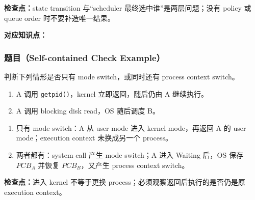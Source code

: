\textbf{检查点：}state transition 与“scheduler 最终选中谁”是两层问题；没有 policy 或 queue order 时不要补造唯一结果。


\textbf{对应知识点：}

\subsubsection*{题目（Self-contained Check Example）}

判断下列情形是否只有 mode switch，或同时还有 process context switch。

\begin{enumerate}[label=(\alph*)]
  \item A 调用 \texttt{getpid()}，kernel 立即返回，随后仍由 A 继续执行。
  \item A 调用 blocking disk read，OS 随后调度 B。
\end{enumerate}

\begin{checkedsolution}
\begin{enumerate}[label=(\alph*)]
  \item 只有 mode switch：A 从 user mode 进入 kernel mode，再返回 A 的 user mode；execution context 未换成另一个 process。
  \item 两者都有：system call 产生 mode switch；A 进入 Waiting 后，OS 保存 $PCB_A$ 并恢复 $PCB_B$，又产生 process context switch。
\end{enumerate}
\end{checkedsolution}

\textbf{检查点：}进入 kernel 不等于更换 process；必须观察返回后执行的是否仍是原 execution context。
